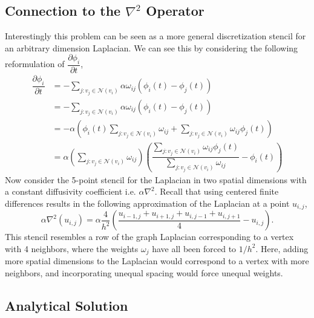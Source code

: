 \documentclass[11pt]{article}
\begin{document}
\subsection*{Connection to the $\nabla^2$ Operator}
Interestingly this problem can be seen as a more general discretization stencil for an arbitrary dimension Laplacian. We can see this by considering the following 
reformulation of $\dfrac{\partial \phi_{i}}{\partial t}$,
\begin{align*}
    \dfrac{\partial \phi_{i}}{\partial t} &= -\sum_{j: v_j \in \mathcal{N}(v_i)} \alpha \omega_{ij}(\phi_i(t) - \phi_j(t))\\
         &= -\sum_{j: v_j \in \mathcal{N}(v_i)} \alpha \omega_{ij}(\phi_i(t) - \phi_j(t))\\
         &= -\alpha \left(\phi_i(t) \sum_{j: v_j \in \mathcal{N}(v_i)}\omega_{ij} + \sum_{j: v_j \in \mathcal{N}(v_i)}\omega_{ij}\phi_j(t)\right) \\
         &= \alpha \left(\sum_{j: v_j \in \mathcal{N}(v_i)}\omega_{ij}\right) \left(\dfrac{\sum_{j: v_j \in \mathcal{N}(v_i)}\omega_{ij}\phi_j(t)}{ \sum_{j: v_j \in \mathcal{N}(v_i)}\omega_{ij}} - \phi_i(t)\right)
\end{align*}
Now consider the 5-point stencil for the Laplacian in two spatial dimensions with a constant diffusivity coefficient i.e. $\alpha \nabla^2$. Recall that using centered finite differences results in the following 
approximation of the Laplacian at a point $u_{i, j}$,\cite{leveque} 
\begin{equation*}
    \alpha\nabla^2(u_{i, j}) = \alpha\frac{4}{h^2}\left(\dfrac{u_{i - 1, j} + u_{i + 1, j} + u_{i, j-1} + u_{i, j+1}}{4} - u_{i, j}\right).
\end{equation*}
This stencil resembles a row of the graph Laplacian corresponding to a vertex with 4 neighbors, where the weights $\omega_j$ have all been forced to $1/h^2$.
Here, adding more spatial dimensions to the Laplacian would correspond to a vertex with more neighbors, and incorporating unequal spacing would force unequal weights. 

\subsection*{Analytical Solution}
\end{document}
